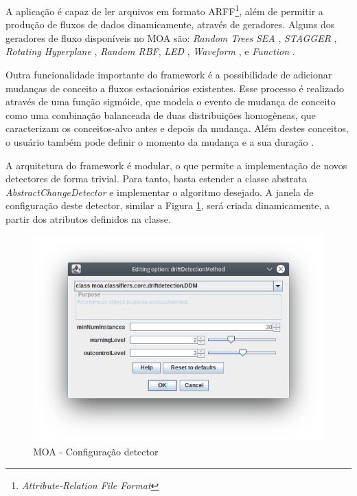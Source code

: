 \documentclass[msc, classic, a4paper]{ufbathesis}
\begin{document}
A aplicação é capaz de ler arquivos em formato ARFF\footnote{\textit{Attribute-Relation File Format}}, além de permitir a produção de fluxos de dados dinamicamente, através de geradores.
Alguns dos geradores de fluxo disponíveis no MOA são:
\textit{Random Trees} \cite{Domingos:2000:MHD:347090.347107}
\textit{SEA} \cite{Street:2001:SEA:502512.502568},
\textit{STAGGER} \cite{Schlimmer1986},
\textit{Rotating Hyperplane} \cite{Wang:2003:MCD:956750.956778},
\textit{Random RBF},
\textit{LED} \cite{Gama:2003:ADT:956750.956813},
\textit{Waveform} \cite{Gama:2003:ADT:956750.956813},
 e \textit{Function} \cite{Jin:2003:EDT:956750.956821}.

Outra funcionalidade importante do framework é a possibilidade de adicionar mudanças de conceito a fluxos estacionários existentes.
Esse processo é realizado através de uma função sigmóide, que modela o evento de mudança de conceito como uma combinação balanceada de duas distribuições homogêneas,
que caracterizam os conceitos-alvo antes e depois da mudança.
Além destes conceitos, o usuário também pode definir o momento da mudança e a sua duração \cite{Bifet:2010:MMO:1756006.1859903}.

A arquitetura do framework é modular, o que permite a implementação de novos detectores de forma trivial.
Para tanto, basta estender a classe abstrata \textit{AbstractChangeDetector} e implementar o algoritmo desejado.
A janela de configuração deste detector, similar a Figura \ref{fig:moa_detector}, será criada dinamicamente, a partir dos atributos definidos na classe.

\begin{figure}[H]
\begin{center}
    \includegraphics[scale=1]{imagens/detector.png}
    \caption{MOA - Configuração detector}
    \label{fig:moa_detector}
\end{center}
\end{figure}
\end{document}
